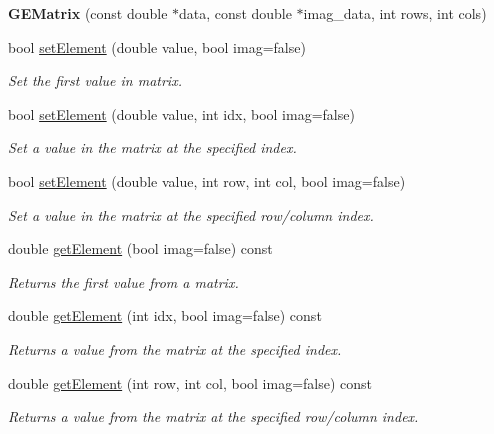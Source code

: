 \begin{DoxyCompactItemize}
\item 
\hypertarget{class_g_e_matrix_aca9df504bab5a9bcaa6321e51e7a3062}{{\bfseries G\-E\-Matrix} (const double $\ast$data, const double $\ast$imag\-\_\-data, int rows, int cols)}\label{class_g_e_matrix_aca9df504bab5a9bcaa6321e51e7a3062}

\item 
bool \hyperlink{class_g_e_matrix_a9cb8b883469fb739b326d4d4a6ca9b4f}{set\-Element} (double value, bool imag=false)
\begin{DoxyCompactList}\small\item\em Set the first value in matrix. \end{DoxyCompactList}\item 
bool \hyperlink{class_g_e_matrix_a10f13d07ac7a962d90a58133cd9dd360}{set\-Element} (double value, int idx, bool imag=false)
\begin{DoxyCompactList}\small\item\em Set a value in the matrix at the specified index. \end{DoxyCompactList}\item 
bool \hyperlink{class_g_e_matrix_aaadecf68d646c2575446e7c1e2307047}{set\-Element} (double value, int row, int col, bool imag=false)
\begin{DoxyCompactList}\small\item\em Set a value in the matrix at the specified row/column index. \end{DoxyCompactList}\item 
double \hyperlink{class_g_e_matrix_add4d33cb6413d01516d11285d05ea3f6}{get\-Element} (bool imag=false) const 
\begin{DoxyCompactList}\small\item\em Returns the first value from a matrix. \end{DoxyCompactList}\item 
double \hyperlink{class_g_e_matrix_a7225d51add332a95d7a92251983c7572}{get\-Element} (int idx, bool imag=false) const 
\begin{DoxyCompactList}\small\item\em Returns a value from the matrix at the specified index. \end{DoxyCompactList}\item 
double \hyperlink{class_g_e_matrix_a6e2f97125ad0cbfb048bae477b4e568d}{get\-Element} (int row, int col, bool imag=false) const 
\begin{DoxyCompactList}\small\item\em Returns a value from the matrix at the specified row/column index. \end{DoxyCompactList}\item 

\end{DoxyCompactItemize}
